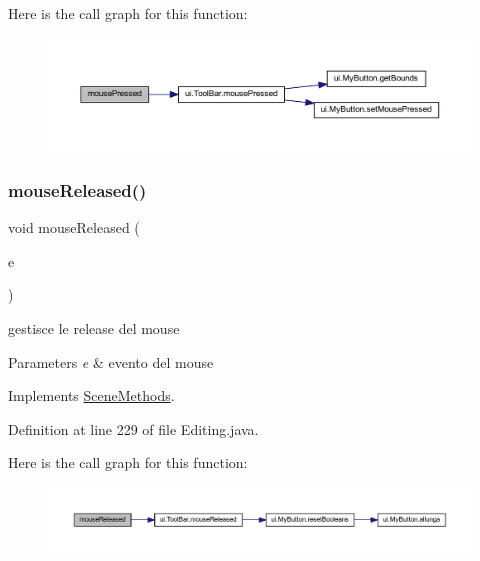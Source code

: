 Here is the call graph for this function\+:\nopagebreak
\begin{figure}[H]
\begin{center}
\leavevmode
\includegraphics[width=350pt]{classscenes_1_1_editing_aed82e1ce3dd3cf283d508c3ba3be70ef_cgraph}
\end{center}
\end{figure}
\mbox{\label{classscenes_1_1_editing_a87a07291794e15052db67f945d90853e}} 
\subsubsection{\texorpdfstring{mouse\+Released()}{mouseReleased()}}
{\footnotesize\ttfamily void mouse\+Released (\begin{DoxyParamCaption}\item[{Mouse\+Event}]{e }\end{DoxyParamCaption})}



gestisce le release del mouse 


\begin{DoxyParams}{Parameters}
{\em e} & evento del mouse \\
\hline
\end{DoxyParams}


Implements \hyperlink{interfacescenes_1_1_scene_methods_a87a07291794e15052db67f945d90853e}{Scene\+Methods}.



Definition at line 229 of file Editing.\+java.

Here is the call graph for this function\+:\nopagebreak
\begin{figure}[H]
\begin{center}
\leavevmode
\includegraphics[width=350pt]{classscenes_1_1_editing_a87a07291794e15052db67f945d90853e_cgraph}
\end{center}
\end{figure}
\mbox{\label{classscenes_1_1_editing_a203b6ad9d5e4d54dd1152986eec4dedc}} 
